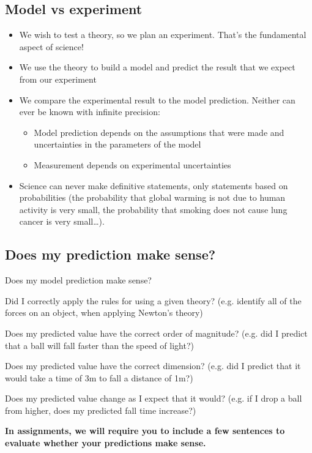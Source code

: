 \documentclass[aspectratio=169,
hyperref={colorlinks,urlcolor=blue}
]{beamer}
\begin{document}
\subsection{Model vs experiment}
\label{subsec:modelvsexperiment}
{
\begin{itemize}
\item We wish to test a theory, so we plan an experiment. That’s the fundamental aspect of science!
\item We use the theory to build a model and predict the result that we expect from our experiment
\item We compare the experimental result to the model prediction. Neither can ever be known with infinite precision:
\begin{itemize}
\item Model prediction depends on the assumptions that were made and uncertainties in the parameters of the model
\item Measurement depends on experimental uncertainties
\end{itemize}

\item[$\rightarrow$] Science can never make definitive statements, only statements based on probabilities (the probability that global warming is not due to human activity is very small, the probability that smoking does not cause lung cancer is very small…).
\end{itemize}
}
{  
}


\subsection{Does my prediction make sense?}
\label{subsec:doesmypredictionmakesense}
\begin{bulletframe}{Does my model prediction make sense?}
\item Did I correctly apply the rules for using a given theory? (e.g. identify all of the forces on an object, when applying Newton’s theory)
\item Does my predicted value have the correct order of magnitude? (e.g. did I predict that a ball will fall faster than the speed of light?)
\item Does my predicted value have the correct dimension? (e.g. did I predict that it would take a time of 3m to fall a distance of 1m?)
\item Does my predicted value change as I expect that it would? (e.g. if I drop a ball from higher, does my predicted fall time increase?)
\item[$\rightarrow$] \textbf{In assignments, we will require you to include a few sentences to evaluate whether your predictions make sense.}
\end{bulletframe}
\end{document}
